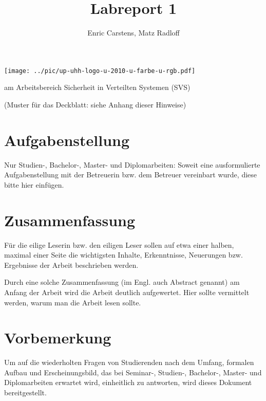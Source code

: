 \documentclass[
    fontsize=12pt,
    headings=small,
    parskip=half,           %
    bibliography=totoc,
    numbers=noenddot,       %
    open=any,               %
    ]{scrreprt}
\title{Labreport 1}
\author{Enric Carstens, Matz Radloff}
\begin{document}
\begin{titlepage}
\texttt{[image: ../pic/up-uhh-logo-u-2010-u-farbe-u-rgb.pdf]}
\begin{center}\Large
    \vfill
    \makeatletter
    {\Large\textsf{\textbf{\@title}}\par}
    \makeatother
    \bigskip
    am Arbeitsbereich Sicherheit in Verteilten Systemen (SVS) \par
    \bigskip
    \makeatletter
    {\@author} \par
    \makeatother
    \bigskip
    \makeatletter
    {\@date}
    \makeatother
    \vfill
    \vfill
    (Muster für das Deckblatt: siehe Anhang dieser Hinweise)
\end{center}
\end{titlepage}

\chapter*{Aufgabenstellung}

Nur Studien-, Bachelor-, Master- und Diplomarbeiten: Soweit eine ausformulierte Aufgabenstellung mit der Betreuerin bzw. dem Betreuer vereinbart wurde, diese bitte hier einfügen.

\chapter*{Zusammenfassung}

Für die eilige Leserin bzw. den eiligen Leser sollen auf etwa einer halben, maximal einer Seite die wichtigsten Inhalte, Erkenntnisse, Neuerungen bzw. Ergebnisse der Arbeit beschrieben werden.

Durch eine solche Zusammenfassung (im Engl. auch Abstract genannt) am Anfang der Arbeit wird die Arbeit deutlich aufgewertet. Hier sollte vermittelt werden, warum man die Arbeit lesen sollte.

\tableofcontents

\chapter{Vorbemerkung}

Um auf die wiederholten Fragen von Studierenden nach dem Umfang, formalen Aufbau und Erscheinungsbild, das bei Seminar-, Studien-, Bachelor-, Master- und Diplomarbeiten erwartet wird, einheitlich zu antworten, wird dieses Dokument bereitgestellt.
\end{document}

